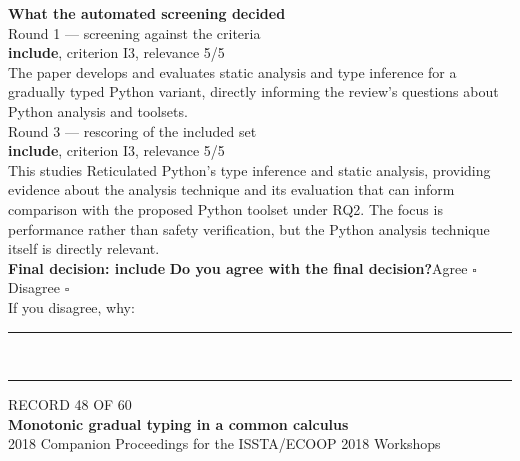 \documentclass[11pt,a4paper]{article}
\begin{document}
\vspace{3mm}
\vspace{2.5mm}
{\small\textbf{What the automated screening decided}}\\[2mm]
{\footnotesize\color{soft}Round 1 --- screening against the criteria}\\[0.5mm]
{\small\textbf{include}, criterion I3, relevance 5/5}\\[0.5mm]
{\small The paper develops and evaluates static analysis and type inference for a gradually typed Python variant, directly informing the review's questions about Python analysis and toolsets.}\\[2.5mm]
{\footnotesize\color{soft}Round 3 --- rescoring of the included set}\\[0.5mm]
{\small\textbf{include}, criterion I3, relevance 5/5}\\[0.5mm]
{\small This studies Reticulated Python's type inference and static analysis, providing evidence about the analysis technique and its evaluation that can inform comparison with the proposed Python toolset under RQ2. The focus is performance rather than safety verification, but the Python analysis technique itself is directly relevant.}\\[2.5mm]
{\small\textbf{Final decision: include}}
\vspace{2mm}
{\small\textbf{Do you agree with the final decision?}\quad{}Agree $\square$\qquad{}Disagree $\square$}\\[1mm]
{\footnotesize\color{soft}If you disagree, why:}\\[1mm]
\color{rule}\rule{\linewidth}{0.3pt}\\[3mm]\rule{\linewidth}{0.3pt}\color{black}
\clearpage
{\color{soft}\footnotesize RECORD 48 OF 60}\\[1mm]
{\large\bfseries Monotonic gradual typing in a common calculus}\\[1.5mm]
{\color{soft}\small 2018 \textperiodcentered{} Companion Proceedings for the ISSTA/ECOOP 2018 Workshops}\\[2mm]
\end{document}
